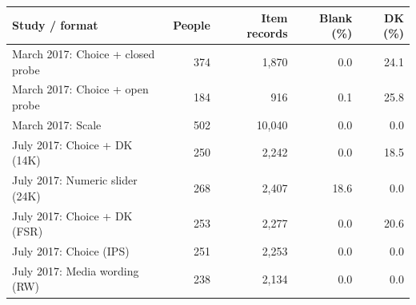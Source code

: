 \begin{tabular}{lrrrr}
\toprule
Study / format & People & Item records & Blank (\%) & DK (\%) \\
\midrule
March 2017: Choice + closed probe & 374 & 1,870 & 0.0 & 24.1 \\
March 2017: Choice + open probe & 184 & 916 & 0.1 & 25.8 \\
March 2017: Scale & 502 & 10,040 & 0.0 & 0.0 \\
July 2017: Choice + DK (14K) & 250 & 2,242 & 0.0 & 18.5 \\
July 2017: Numeric slider (24K) & 268 & 2,407 & 18.6 & 0.0 \\
July 2017: Choice + DK (FSR) & 253 & 2,277 & 0.0 & 20.6 \\
July 2017: Choice (IPS) & 251 & 2,253 & 0.0 & 0.0 \\
July 2017: Media wording (RW) & 238 & 2,134 & 0.0 & 0.0 \\
\bottomrule
\end{tabular}
